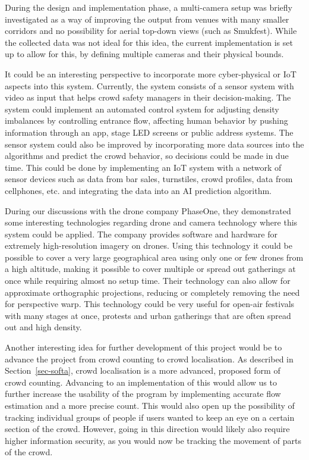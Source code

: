 \documentclass[
]{article}
\begin{document}
During the design and implementation phase, a multi-camera setup was
briefly investigated as a way of improving the output from venues with
many smaller corridors and no possibility for aerial top-down views
(such as Smukfest). While the collected data was not ideal for this
idea, the current implementation is set up to allow for this, by
defining multiple cameras and their physical bounds.

It could be an interesting perspective to incorporate more
cyber-physical or IoT aspects into this system. Currently, the system
consists of a sensor system with video as input that helps crowd safety
managers in their decision-making. The system could implement an
automated control system for adjusting density imbalances by controlling
entrance flow, affecting human behavior by pushing information through
an app, stage LED screens or public address systems. The sensor system
could also be improved by incorporating more data sources into the
algorithms and predict the crowd behavior, so decisions could be made in
due time. This could be done by implementing an IoT system with a
network of sensor devices such as data from bar sales, turnstiles, crowd
profiles, data from cellphones, etc. and integrating the data into an AI
prediction algorithm.

During our discussions with the drone company PhaseOne, they
demonstrated some interesting technologies regarding drone and camera
technology where this system could be applied. The company provides
software and hardware for extremely high-resolution imagery on drones.
Using this technology it could be possible to cover a very large
geographical area using only one or few drones from a high altitude,
making it possible to cover multiple or spread out gatherings at once
while requiring almost no setup time. Their technology can also allow
for approximate orthographic projections, reducing or completely
removing the need for perspective warp. This technology could be very
useful for open-air festivals with many stages at once, protests and
urban gatherings that are often spread out and high density.

Another interesting idea for further development of this project would
be to advance the project from crowd counting to crowd localisation. As
described in Section~\ref{sec-softa}, crowd localisation is a more
advanced, proposed form of crowd counting. Advancing to an
implementation of this would allow us to further increase the usability
of the program by implementing accurate flow estimation and a more
precise count. This would also open up the possibility of tracking
individual groups of people if users wanted to keep an eye on a certain
section of the crowd. However, going in this direction would likely also
require higher information security, as you would now be tracking the
movement of parts of the crowd.
\end{document}
